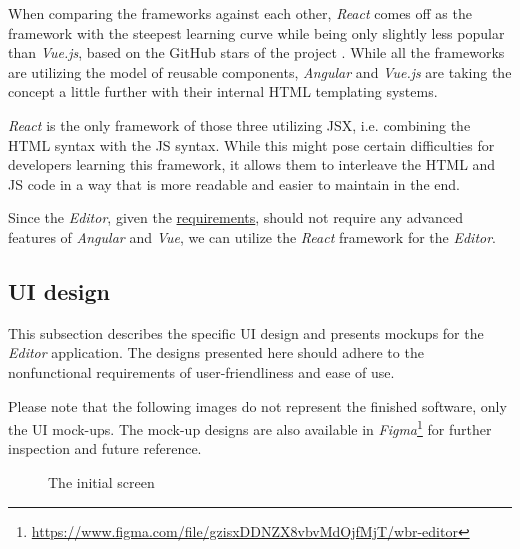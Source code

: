 When comparing the frameworks against each other, \textit{React} comes off as the framework with the steepest learning curve while being only slightly less popular than \textit{Vue.js}, based on the GitHub stars of the project .
While all the frameworks are utilizing the model of reusable components, \textit{Angular} and \textit{Vue.js} are taking the concept a little further with their internal \acs{HTML} templating systems.

\textit{React} is the only framework of those three utilizing \acs{JSX}, i.e. combining the \acs{HTML} syntax with the \acs{JS} syntax. 
While this might pose certain difficulties for developers learning this framework, it allows them to interleave the \acs{HTML} and \acs{JS} code in a way that is more readable and easier to maintain in the end.

Since the \textit{Editor}, given the \hyperref[requirements]{requirements}, should not require any advanced features of \textit{Angular} and \textit{Vue}, 
we can utilize the \textit{React} framework for the \textit{Editor}.

\subsection{UI design}

This subsection describes the specific \acs{UI} design and presents mockups for the \textit{Editor} application.
The designs presented here should adhere to the nonfunctional requirements of user-friendliness and ease of use.

Please note that the following images do not represent the finished software, only the UI mock-ups.
The mock-up designs are also available in \textit{Figma}\footnote{\href{https://www.figma.com/file/gzisxDDNZX8vbvMdOjfMjT/wbr-editor}{https://www.figma.com/file/gzisxDDNZX8vbvMdOjfMjT/wbr-editor}} for further inspection and future reference.

\begin{figure}[!h]
    \begin{center}
    \end{center}
    \caption{The initial screen}
\end{figure}

